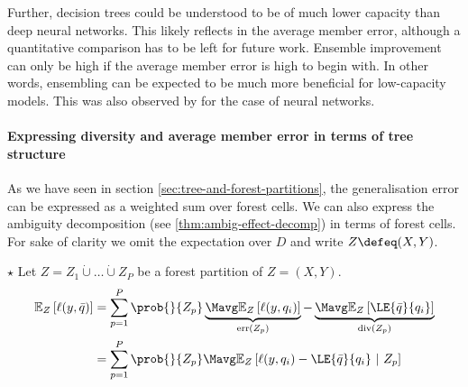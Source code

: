 \documentclass[
	twoside=false, %
]{kaobook}
\begin{document}
Further, decision trees could be understood to be of much lower capacity than deep neural networks. This likely reflects in the average member error, although a quantitative comparison has to be left for future work. Ensemble improvement can only be high if the average member error is high to begin with. In other words, ensembling can be expected to be much more beneficial for low-capacity models. This was also observed by \citeauthor{abe} \cite{abe} for the case of neural networks.

\paragraph{Expressing diversity and average member error in terms of tree structure} As we have seen in section \ref{sec:tree-and-forest-partitions}, the generalisation error can be expressed as a weighted sum over forest cells. 
We can also express the ambiguity decomposition (see \ref{thm:ambig-effect-decomp}) in terms of forest cells.
For sake of clarity we omit the expectation over $D$ and write $Z \defeq (X,Y)$.  
\begin{proposition} $\star$
Let
$Z = Z_{1} \dot\cup \dots \dot\cup Z_{P}$ be a forest partition of $Z=(X,Y)$.
\begin{align*}
\mathbb{E}_{Z}\left[ \ell(y, \bar{q}) \right]  &= \sum_{p=1}^P \prob{}{Z_{p}}  
\underbrace{
\Mavg \mathbb{E}_{Z}\left[ \ell(y,q_{i})  \right] 
 }_{\text{err}(Z_p) }
 -  
 \underbrace{
\Mavg \mathbb{E}_{Z}\left[ \LE{\bar{q}}{q_{i}} \right]   
}_{\text{div}(Z_p) } 
\\
&= \sum_{p=1}^P \prob{}{Z_{p}} \Mavg \mathbb{E}_{Z}\left[ \ell(y,q_{i}) - \LE{\bar{q}}{q_{i}} ~|~ Z_p \right] 
\end{align*}
\end{proposition}
\end{document}
